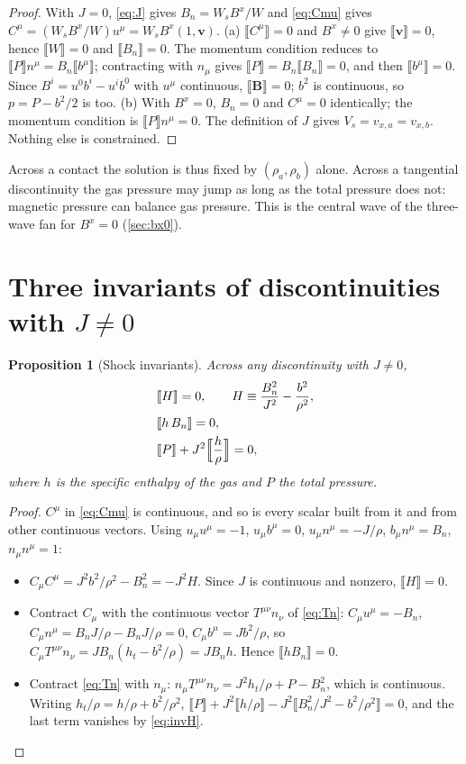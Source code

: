 \documentclass[11pt,a4paper,oneside,openany]{book}
\theoremstyle{definition}
\theoremstyle{plain}
\newtheorem{proposition}{Proposition}[chapter]
\theoremstyle{remark}
\newcommand{\jump}[1]{\llbracket #1\rrbracket}
\newcommand{\vv}{\bm{v}}
\newcommand{\BB}{\bm{B}}
\newcommand{\Ptot}{P}
\begin{document}
\begin{proof}
With $J=0$, \eqref{eq:J} gives $B_n=W_sB^x/W$ and \eqref{eq:Cmu} gives
$C^\mu=(W_sB^x/W)u^\mu=W_sB^x(1,\vv)$.
(a) $\jump{C^\mu}=0$ and $B^x\neq0$ give $\jump{\vv}=0$, hence $\jump{W}=0$ and
$\jump{B_n}=0$. The momentum condition reduces to $\jump{\Ptot}n^\mu=B_n\jump{b^\mu}$;
contracting with $n_\mu$ gives $\jump{\Ptot}=B_n\jump{B_n}=0$, and then $\jump{b^\mu}=0$.
Since $B^i=u^0b^i-u^ib^0$ with $u^\mu$ continuous, $\jump{\BB}=0$; $b^2$ is continuous, so
$p=\Ptot-b^2/2$ is too.
(b) With $B^x=0$, $B_n=0$ and $C^\mu=0$ identically; the momentum condition is
$\jump{\Ptot}n^\mu=0$. The definition of $J$ gives $V_s=v_{x,a}=v_{x,b}$. Nothing else is
constrained.
\end{proof}

Across a contact the solution is thus fixed by $(\rho_a,\rho_b)$ alone. Across a
tangential discontinuity the gas pressure may jump as long as the total pressure does
not: magnetic pressure can balance gas pressure. This is the central wave of the
three-wave fan for $B^x=0$ (\cref{sec:bx0}).

\section{Three invariants of discontinuities with \texorpdfstring{$J\ne0$}{J != 0}}

\begin{proposition}[Shock invariants]\label{prop:invariants}
Across any discontinuity with $J\neq0$,
\begin{align}
&\jump{H}=0,\qquad H\equiv\frac{B_n^2}{J^2}-\frac{b^2}{\rho^2}, \label{eq:invH}\\
&\jump{h\,B_n}=0, \label{eq:invhB}\\
&\jump{\Ptot}+J^2\Bigl\llbracket\frac{h}{\rho}\Bigr\rrbracket=0, \label{eq:magtaub}
\end{align}
where $h$ is the specific enthalpy of the gas and $\Ptot$ the total pressure.
\end{proposition}

\begin{proof}
$C^\mu$ in \eqref{eq:Cmu} is continuous, and so is every scalar built from it and from
other continuous vectors. Using $u_\mu u^\mu=-1$, $u_\mu b^\mu=0$, $u_\mu n^\mu=-J/\rho$,
$b_\mu n^\mu=B_n$, $n_\mu n^\mu=1$:
\begin{itemize}[nosep]
\item $C_\mu C^\mu=J^2b^2/\rho^2-B_n^2=-J^2H$. Since $J$ is continuous and nonzero,
  $\jump{H}=0$.
\item Contract $C_\mu$ with the continuous vector $T^{\mu\nu}n_\nu$ of \eqref{eq:Tn}:
  $C_\mu u^\mu=-B_n$, $C_\mu n^\mu=B_nJ/\rho-B_nJ/\rho=0$, $C_\mu b^\mu=Jb^2/\rho$, so
  $C_\mu T^{\mu\nu}n_\nu=JB_n(h_t-b^2/\rho)=JB_nh$. Hence $\jump{hB_n}=0$.
\item Contract \eqref{eq:Tn} with $n_\mu$: $n_\mu T^{\mu\nu}n_\nu=J^2h_t/\rho+\Ptot-B_n^2$,
  which is continuous. Writing $h_t/\rho=h/\rho+b^2/\rho^2$,
  $\jump{\Ptot}+J^2\jump{h/\rho}-J^2\jump{B_n^2/J^2-b^2/\rho^2}=0$, and the last term
  vanishes by \eqref{eq:invH}.\qedhere
\end{itemize}
\end{proof}
\end{document}
